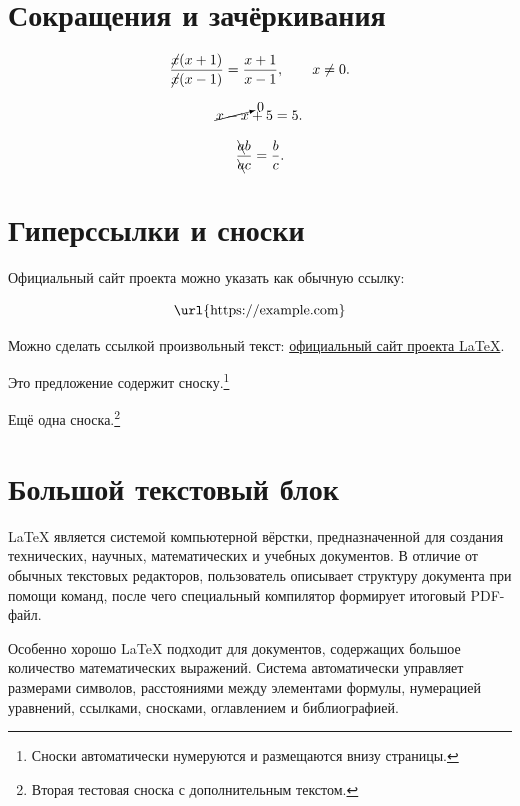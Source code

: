 \documentclass[12pt,a4paper]{article}
\theoremstyle{definition}
\theoremstyle{remark}
\begin{document}
\section{Сокращения и зачёркивания}

\[
    \frac{\cancel{x}(x+1)}
    {\cancel{x}(x-1)}
    =
    \frac{x+1}{x-1},
    \qquad x\neq0.
\]

\[
    \cancelto{0}{x-x}+5=5.
\]

\[
    \frac{
        \bcancel{a}b
    }{
        \bcancel{a}c
    }
    =
    \frac{b}{c}.
\]


\section{Гиперссылки и сноски}

Официальный сайт проекта можно указать как обычную ссылку:

\[
    \text{\url{https://example.com}}
\]

Можно сделать ссылкой произвольный текст:
\href{https://www.latex-project.org/}{официальный сайт проекта LaTeX}.

Это предложение содержит сноску.\footnote{
Сноски автоматически нумеруются и размещаются внизу страницы.
}

Ещё одна сноска.\footnote{
Вторая тестовая сноска с дополнительным текстом.
}


\section{Большой текстовый блок}

LaTeX является системой компьютерной вёрстки, предназначенной для
создания технических, научных, математических и учебных документов.
В отличие от обычных текстовых редакторов, пользователь описывает
структуру документа при помощи команд, после чего специальный
компилятор формирует итоговый PDF-файл.

Особенно хорошо LaTeX подходит для документов, содержащих большое
количество математических выражений. Система автоматически управляет
размерами символов, расстояниями между элементами формулы, нумерацией
уравнений, ссылками, сносками, оглавлением и библиографией.
\end{document}
